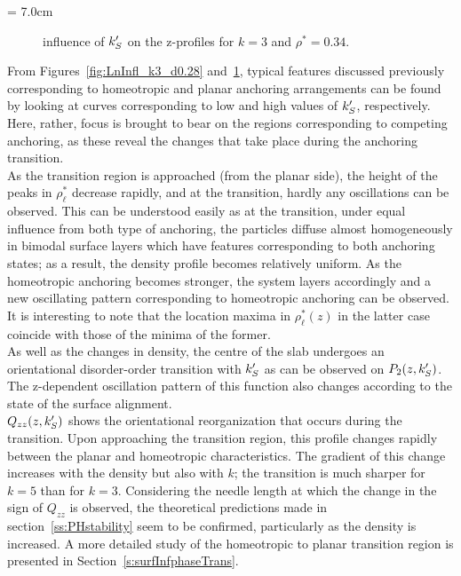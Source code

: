 \picW = 7.0cm
\begin{figure}
        \centering
	\caption{influence of $k_S^{\prime}$ on the z-profiles for $k=3$ and $\rho^{*} = 0.34$.}
	\label{fig:LnInfl_k3_d0.34}
\end{figure}

From Figures~\ref{fig:LnInfl_k3_d0.28} and~\ref{fig:LnInfl_k3_d0.34}, typical features 
discussed previously corresponding to homeotropic and planar anchoring arrangements can be
found by looking at curves corresponding to low and high values of $k_S^{\prime}$, respectively.
Here, rather,
 focus is brought to bear on the regions corresponding to competing anchoring, as these reveal
the changes that take place during the anchoring transition.\\
%
As the transition region is approached (\eg from the planar side), the height of the peaks in 
$\rho^{*}_\ell$ decrease rapidly, and at the transition, hardly any oscillations can be observed. 
This can be understood easily as at the transition, under equal influence from both type of
anchoring, the particles diffuse almost homogeneously in bimodal surface layers which have
features corresponding to both
anchoring states; as a result, the density profile becomes relatively uniform. As the 
homeotropic anchoring becomes stronger,
the system layers accordingly and a new oscillating pattern corresponding to homeotropic
anchoring can be observed. It is interesting to note that the location 
maxima in $\rho^{*}_\ell(z)$ in the latter case coincide with those of the minima of the former.\\
%
As well as the changes in density, the centre of the slab undergoes an orientational 
disorder-order transition with $k_S^{\prime}$ as can be
observed on $P_2(z,k_S^{\prime})$. The z-dependent oscillation pattern of this function also changes
according to the state of the surface alignment.\\

$Q_{zz}(z,k_S^{\prime})$ shows the orientational reorganization that occurs during the transition.
Upon approaching the transition region, this profile changes rapidly between the planar and
homeotropic characteristics. The gradient of this change increases with the density but also
with $k$; the transition is much sharper for $k=5$ than for $k=3$.
Considering the needle length at which the change in the sign of $Q_{zz}$ is observed, the
theoretical predictions made in section~\ref{ss:PHstability} seem to be confirmed, particularly
as the density is increased. A more detailed study of the homeotropic to planar transition
region is presented in Section~\ref{s:surfInfphaseTrans}.




